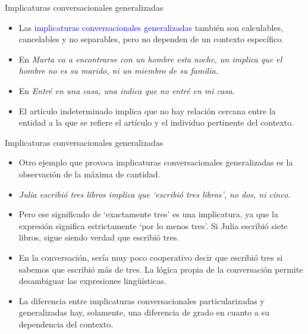 \documentclass{beamer}
\begin{document}
\begin{frame}{Implicaturas conversacionales generalizadas}

	\begin{itemize}
		\item Las \textcolor{blue}{implicaturas conversacionales generalizadas} también son calculables, cancelables y no separables, pero no dependen de un contexto específico.
		\item En \it{Marta va a encontrarse con un hombre esta noche}, \it{un} implica que el hombre no es su marido, ni un miembro de su familia. 
		\item En \it{Entré en una casa}, \it{una} indica que no entré en mi casa.
		\item El artículo indeterminado implica que no hay relación cercana entre la entidad a la que se refiere el artículo y el individuo pertinente del contexto.
	\end{itemize}

\end{frame}

\begin{frame}{Implicaturas conversacionales generalizadas}

	\begin{itemize}
		\item Otro ejemplo que provoca implicaturas conversacionales generalizadas es la observación de la máxima de cantidad.
		\item \it{Julia escribió tres libros} implica que `escribió tres libros', no dos, ni cinco.
		\item Pero ese significado de `exactamente tres' es una implicatura, ya que la expresión significa estrictamente `por lo menos tres'. Si Julia escribió siete libros, sigue siendo verdad que escribió tres.
		\item En la conversación, sería muy poco cooperativo decir que escribió tres si sabemos que escribió más de tres. La lógica propia de la conversación permite desambiguar las expresiones lingüísticas.
		\item La diferencia entre implicaturas conversacionales particularizadas y generalizadas hay, solamente, una diferencia de grado en cuanto a su dependencia del contexto. 
	\end{itemize}

\end{frame}
\end{document}
